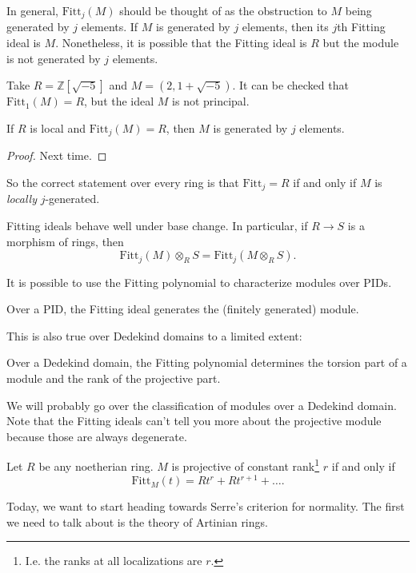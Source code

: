 In general, $\mathrm{Fitt}_j(M)$ should be thought of as the obstruction to $M$
being generated by $j$ elements. If $M$ is generated by $j$ elements, then its
$j$th Fitting ideal is $M$. Nonetheless, it is possible that the Fitting ideal
is $R$ but the module is not generated by $j$ elements.

\begin{example} 
Take $R  = \mathbb{Z}[\sqrt{-5}]$ and $M = (2, 1+\sqrt{-5})$. It can be checked
that $\mathrm{Fitt}_1(M) = R$, but the ideal $M$ is not principal. 
\end{example} 

\begin{proposition} 
If $R$ is local and $\mathrm{Fitt}_j(M) =R$, then $M$ is generated by $j$
elements. 
\end{proposition} 
\begin{proof} 
Next time.
\end{proof} 

So the correct statement over every ring is that $\mathrm{Fitt}_j=R$ if and
only if $M$ is \emph{locally} $j$-generated.

\begin{remark} 
Fitting ideals behave well under base change.  In particular, if $R \to S$ is a
morphism of rings, then
\[ \mathrm{Fitt}_j(M) \otimes_R S = \mathrm{Fitt}_j(M \otimes_R S).   \]
\end{remark} 

It is possible to use the Fitting polynomial to characterize modules over PIDs.

\begin{theorem} 
Over a PID, the Fitting ideal generates the (finitely generated) module.
\end{theorem} 

This is also true over Dedekind domains to a limited extent:

\begin{theorem} 
Over a Dedekind domain, the Fitting polynomial determines the torsion part of a
module and the rank of the projective part.
\end{theorem} 

We will probably go over the classification of modules over a Dedekind domain.
Note that the Fitting ideals can't tell you more about the projective module
because those are always degenerate.

\begin{theorem} Let $R$ be any noetherian ring. 
$M$ is projective of constant rank\footnote{I.e. the ranks at all localizations
are $r$.} $r$ if and only if 
\[ \mathrm{Fitt}_M(t) = Rt^r + Rt^{r+1} + \dots.   \]
\end{theorem} 
Today, we want to start heading towards Serre's criterion for normality. The
first we need to talk about is the theory of Artinian rings.
